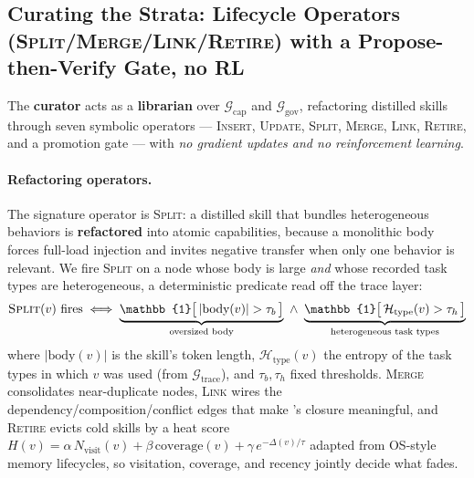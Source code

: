 \subsection{Curating the Strata: Lifecycle Operators (\textsc{Split}/\textsc{Merge}/\textsc{Link}/\textsc{Retire}) with a Propose-then-Verify Gate, no RL}
\label{sec:m2}

The \textbf{curator} acts as a \textbf{librarian} over $\mathcal{G}_{\text{cap}}$ and $\mathcal{G}_{\text{gov}}$, refactoring distilled skills through seven symbolic operators --- \textsc{Insert}, \textsc{Update}, \textsc{Split}, \textsc{Merge}, \textsc{Link}, \textsc{Retire}, and a promotion gate --- with \emph{no gradient updates and no reinforcement learning}.

\paragraph{Refactoring operators.}
The signature operator is \textsc{Split}: a distilled skill that bundles heterogeneous behaviors is \textbf{refactored} into atomic capabilities, because a monolithic body forces full-load injection and invites negative transfer when only one behavior is relevant.
We fire \textsc{Split} on a node whose body is large \emph{and} whose recorded task types are heterogeneous, a deterministic predicate read off the trace layer:
\begin{equation}
\textsc{Split}(v)\ \text{fires} \iff \underbrace{\mathbb{1}\big[\,|\text{body}(v)| > \tau_b\,\big]}_{\text{oversized body}}\ \wedge\ \underbrace{\mathbb{1}\big[\,\mathcal{H}_{\text{type}}(v) > \tau_h\,\big]}_{\text{heterogeneous task types}}
\label{eq:split}
\end{equation}
where $|\text{body}(v)|$ is the skill's token length, $\mathcal{H}_{\text{type}}(v)$ the entropy of the task types in which $v$ was used (from $\mathcal{G}_{\text{trace}}$), and $\tau_b,\tau_h$ fixed thresholds.
\textsc{Merge} consolidates near-duplicate nodes, \textsc{Link} wires the dependency/composition/conflict edges that make 's closure meaningful, and \textsc{Retire} evicts cold skills by a heat score $H(v)=\alpha\,N_{\text{visit}}(v)+\beta\,\text{coverage}(v)+\gamma\,e^{-\Delta(v)/\tau}$ adapted from OS-style memory lifecycles, so visitation, coverage, and recency jointly decide what fades.


